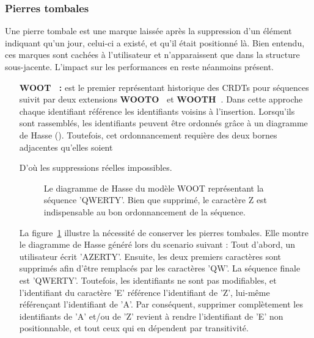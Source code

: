\subsubsection{Pierres tombales}
\label{repl:subsubsec:tombstone}

Une pierre tombale est une marque laissée après la suppression d'un élément
indiquant qu'un jour, celui-ci a existé, et qu'il était positionné là. Bien
entendu, ces marques sont cachées à l'utilisateur et n'apparaissent que dans la
structure sous-jacente. L'impact sur les performances en reste néanmoins
présent.

\begin{itemize}
\item [\textbf{WOOT~\cite{oster2006data} :}] est le premier représentant
  historique des CRDTs pour séquences suivit par deux extensions
  \textbf{WOOTO~\cite{weiss2007wooki}} et
  \textbf{WOOTH~\cite{ahmed2011evaluating}}. Dans cette approche chaque
  identifiant référence les identifiants voisins à l'insertion.  Lorsqu'ils sont
  rassemblés, les identifiants peuvent être ordonnés grâce à un diagramme de
  Hasse (\REF). Toutefois, cet ordonnancement requière des deux bornes
  adjacentes qu'elles soient
  D'où les suppressions réelles impossibles.

  \begin{figure}
    \centering
    
    \caption{\label{repl:fig:wootexample}Le diagramme de Hasse du modèle WOOT
      représentant la séquence 'QWERTY'. Bien que supprimé, le caractère Z est
      indispensable au bon ordonnancement de la séquence.}
  \end{figure}

  La figure~\ref{repl:fig:wootexample} illustre la nécessité de conserver les
  pierres tombales. Elle montre le diagramme de Hasse généré lors du scenario
  suivant : Tout d'abord, un utilisateur écrit 'AZERTY'. Ensuite, les deux
  premiers caractères sont supprimés afin d'être remplacés par les caractères
  'QW'. La séquence finale est 'QWERTY'. Toutefois, les identifiants ne sont pas
  modifiables, et l'identifiant du caractère 'E' référence l'identifiant de 'Z',
  lui-même référençant l'identifiant de 'A'. Par conséquent, supprimer
  complètement les identifiants de 'A' et/ou de 'Z' revient à rendre
  l'identifiant de 'E' non positionnable, et tout ceux qui en dépendent par
  transitivité.


\end{itemize}
